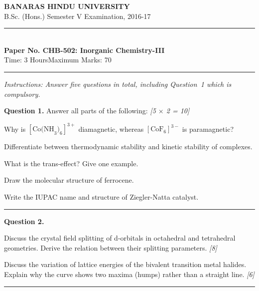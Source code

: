 \documentclass[11pt,a4paper]{article}
\newcommand{\pts}[1]{\hfill   \textit{[#1]}}
\begin{document}
\begin{center}
  {\large\bfseries BANARAS HINDU UNIVERSITY}\\[2pt]
  {\normalsize B.Sc. (Hons.) Semester V Examination, 2016-17}\\[6pt]
  \rule{0.8\linewidth}{0.5pt}\\[6pt]
  {\large\bfseries Paper No. CHB-502: Inorganic Chemistry-III}\\[4pt]
  {\normalsize Time: 3 Hours\hfill Maximum Marks: 70}
\end{center}
\rule{\linewidth}{0.4pt}
\small



\noindent   \textit{Instructions: Answer five questions in total, including Question~1 which is compulsory.}

\normalsize
\bigskip




\noindent   \textbf{Question 1.} Answer all parts of the following: \pts{5 $ \times$ 2 = 10}

\begin{parts}
  \item Why is $[ \text{Co(NH}_3)_6]^{3+}$ diamagnetic, whereas $[ \text{CoF}_6]^{3-}$ is paramagnetic?
  \item Differentiate between thermodynamic stability and kinetic stability of complexes.
  \item What is the trans-effect? Give one example.
  \item Draw the molecular structure of ferrocene.
  \item Write the IUPAC name and structure of Ziegler-Natta catalyst.
\end{parts}

\medskip\rule{\linewidth}{0.2pt}




\noindent   \textbf{Question 2.}

\begin{parts}
  \item Discuss the crystal field splitting of d-orbitals in octahedral and tetrahedral geometries. Derive the relation between their splitting parameters. \pts{8}
  \item Discuss the variation of lattice energies of the bivalent transition metal halides. Explain why the curve shows two maxima (humps) rather than a straight line. \pts{6}
\end{parts}

\medskip\rule{\linewidth}{0.2pt}
\end{document}
